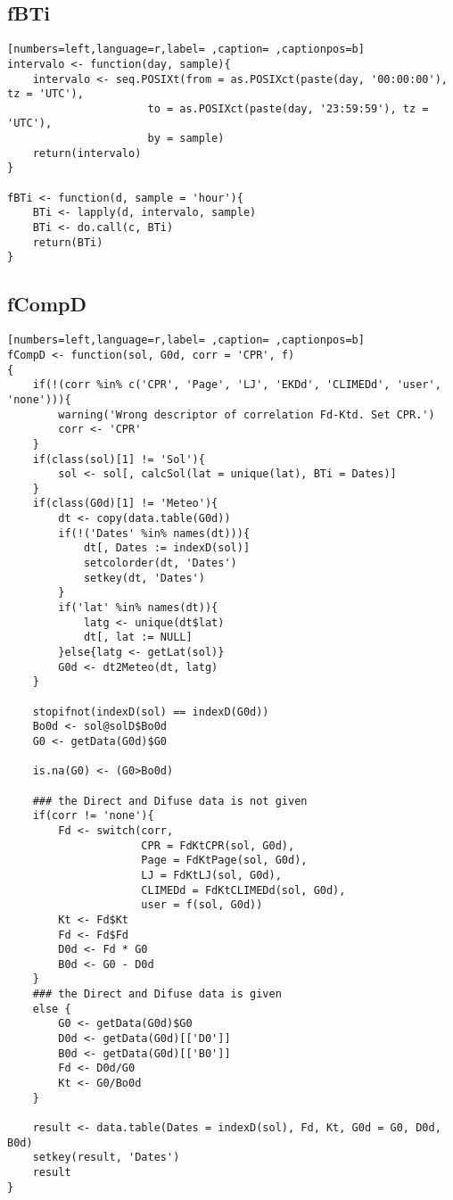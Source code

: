 \subsection{fBTi}
\label{sec:orgc8fc69a}
\begin{lstlisting}[numbers=left,language=r,label= ,caption= ,captionpos=b]
intervalo <- function(day, sample){
    intervalo <- seq.POSIXt(from = as.POSIXct(paste(day, '00:00:00'), tz = 'UTC'),
                      to = as.POSIXct(paste(day, '23:59:59'), tz = 'UTC'),
                      by = sample)
    return(intervalo)
}

fBTi <- function(d, sample = 'hour'){
    BTi <- lapply(d, intervalo, sample)
    BTi <- do.call(c, BTi)
    return(BTi)
}
\end{lstlisting}
\subsection{fCompD}
\label{sec:org8fc1c85}
\begin{lstlisting}[numbers=left,language=r,label= ,caption= ,captionpos=b]
fCompD <- function(sol, G0d, corr = 'CPR', f)
{
    if(!(corr %in% c('CPR', 'Page', 'LJ', 'EKDd', 'CLIMEDd', 'user', 'none'))){
        warning('Wrong descriptor of correlation Fd-Ktd. Set CPR.')
        corr <- 'CPR'
    }
    if(class(sol)[1] != 'Sol'){
        sol <- sol[, calcSol(lat = unique(lat), BTi = Dates)]
    }
    if(class(G0d)[1] != 'Meteo'){
        dt <- copy(data.table(G0d))
        if(!('Dates' %in% names(dt))){
            dt[, Dates := indexD(sol)]
            setcolorder(dt, 'Dates')
            setkey(dt, 'Dates')
        }
        if('lat' %in% names(dt)){
            latg <- unique(dt$lat)
            dt[, lat := NULL]
        }else{latg <- getLat(sol)}
        G0d <- dt2Meteo(dt, latg)
    }  

    stopifnot(indexD(sol) == indexD(G0d))
    Bo0d <- sol@solD$Bo0d
    G0 <- getData(G0d)$G0

    is.na(G0) <- (G0>Bo0d)

    ### the Direct and Difuse data is not given
    if(corr != 'none'){
        Fd <- switch(corr,
                     CPR = FdKtCPR(sol, G0d),
                     Page = FdKtPage(sol, G0d),
                     LJ = FdKtLJ(sol, G0d),
                     CLIMEDd = FdKtCLIMEDd(sol, G0d),
                     user = f(sol, G0d))
        Kt <- Fd$Kt
        Fd <- Fd$Fd
        D0d <- Fd * G0
        B0d <- G0 - D0d
    }
    ### the Direct and Difuse data is given
    else {
        G0 <- getData(G0d)$G0
        D0d <- getData(G0d)[['D0']]
        B0d <- getData(G0d)[['B0']]
        Fd <- D0d/G0
        Kt <- G0/Bo0d
    }

    result <- data.table(Dates = indexD(sol), Fd, Kt, G0d = G0, D0d, B0d)
    setkey(result, 'Dates')
    result
}
\end{lstlisting}
